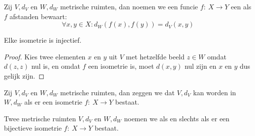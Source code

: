 \documentclass[main.tex]{subfiles}
\begin{document}
\begin{de}
  Zij $V,d_{V}$ en $W,d_{W}$ metrische ruimten, dan noemen we een funcie $f:\ X \rightarrow Y$ een  als $f$ afstanden bewaart:
  \[ \forall x,y \in X: d_{W}(f(x),f(y)) = d_{V}(x,y) \]
\end{de}

\begin{st}
  Elke isometrie is injectief.

  \begin{proof}
    Kies twee elementen $x$ en $y$ uit $V$ met hetzelfde beeld $z\in W$ omdat $d(z,z)$ nul is, en omdat $f$ een isometrie is, moet $d(x,y)$ nul zijn en $x$ en $y$ dus gelijk zijn.
  \end{proof}
\end{st}

\begin{de}
  Zij $V,d_{V}$ en $W,d_{W}$ metrische ruimten, dan zeggen we dat $V,d_{V}$  kan worden in $W,d_{W}$ als er een isometrie $f:\ X \rightarrow Y$ bestaat.
\end{de}

\begin{de}
  Twee metrische ruimten $V,d_{V}$ en $W,d_{W}$ noemen we  als en slechts als er een bijectieve isometrie $f:\ X \rightarrow Y$ bestaat.
\end{de}


\end{document}
